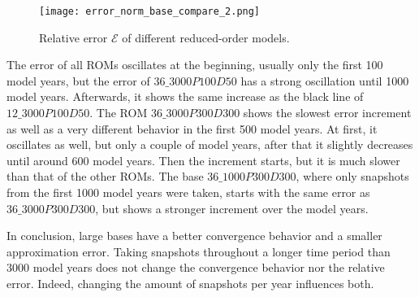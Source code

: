 \begin{figure}[H]
\centering
  \texttt{[image: error\_norm\_base\_compare\_2.png]}
  \caption{Relative error $\mathcal{E}$ of different reduced-order models.}
  \label{fig:relative_error}
\end{figure}

The error of all ROMs oscillates at the beginning, usually only the first 100 model years, but the error of $36\_3000P100D50$ has a strong oscillation until 1000 model years.
Afterwards, it shows the same increase as the black line of $12\_3000P100D50$. The ROM $36\_3000P300D300$ shows the slowest error increment as well as a
very different behavior in the first 500 model years. At first, it oscillates as well, but only a couple of model years, after that it slightly decreases until around 600 model years.
Then the increment starts, but it is much slower than that of the other ROMs. The base $36\_1000P300D300$, where only snapshots from the first 1000 model years were taken, starts 
with the same error as $36\_3000P300D300$, but shows a stronger increment over the model years.

In conclusion, large bases have a better convergence behavior and a smaller approximation error. Taking snapshots throughout a longer time period than 3000 model years does not change the convergence behavior nor the relative error. Indeed, changing the amount of snapshots per year influences both.


